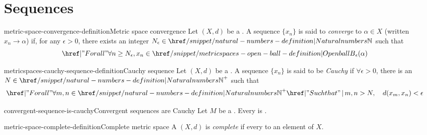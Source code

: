 \documentclass[preview]{standalone}
\begin{document}
\genpage

\section{Sequences}

\begin{snippetdefinition}{metric-space-convergence-definition}{Metric space convergence}
    Let \((X, d)\) be a \metricspace.
    A sequence \(\{x_n\}\) is said to \textit{converge}
    to \(\alpha \in X\) (written \(x_n\to\alpha\)) if, for any \(\epsilon > 0\),
    there exists an integer \(N_\epsilon \in \naturalnumbers\) such that
    \[\forall n \geq N_\epsilon, x_n \in \ball_\epsilon(\alpha) \]
\end{snippetdefinition}


\begin{snippetdefinition}{metricspaces-cauchy-sequence-definition}{Cauchy sequence}
    Let \((X, d)\) be a \metricspace.
    A sequence \(\{x_n\}\) is said to be \textit{Cauchy}
    if \(\forall \epsilon > 0\), there is an \(N\in{\naturalnumbers}^+\)
    such that \[ \forall m,n \in {\naturalnumbers}^+ \suchthat m,n > N, \quad d(x_m, x_n) < \epsilon \]
\end{snippetdefinition}


\begin{snippetproposition}{convergent-sequence-is-cauchy}{Convergent sequences are Cauchy}
    Let \(M\) be a \metricspace.
    Every  is \mscauchy.
\end{snippetproposition}

\begin{snippetdefinition}{metric-space-complete-definition}{Complete metric space}
    A \metricspace \((X, d)\) is \textit{complete} if every 
    \msconvergence[converges] to an element of \(X\).
\end{snippetdefinition}

\end{document}
